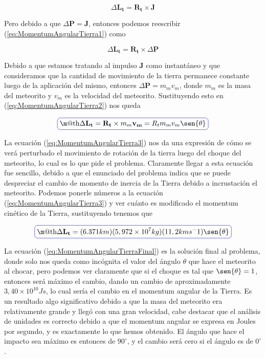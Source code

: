 \documentclass[a4paper,10pt]{article}
\makeatletter
\numberwithin{equation}{section}
\newcommand*{\boxcolor}{blue}
\renewcommand{\boxed}[1]{\textcolor{\boxcolor}{%
\tikz[baseline={([yshift=-1ex]current bounding box.center)}] \node [rectangle, minimum width=1ex,rounded corners,draw] {\normalcolor\m@th$\displaystyle#1$};}}
\makeatother
\begin{document}
\begin{equation}
 \Delta \mathbf{L_t} = \mathbf{R_t} \times \mathbf{J}
 \label{eq:MomentumAngularTierra1}
\end{equation}

Pero debido a que $\Delta \mathbf{P} = \mathbf{J}$, entonces podemos reescribir 
(\ref{eq:MomentumAngularTierra1}) como

\begin{equation}
 \Delta \mathbf{L_t} = \mathbf{R_t} \times \Delta \mathbf{P}
 \label{eq:MomentumAngularTierra2} 
\end{equation}

Debido a que estamos tratando al impulso $\mathbf{J}$ como instantáneo y que consideramos
que la cantidad de movimiento de la tierra permanece constante luego de la aplicación
del mismo, entonces $\Delta \mathbf{P} = m_m v_m$, donde $m_m$ es la masa del meteorito
y $v_m$ es la velocidad del meteorito. Sustituyendo esto en (\ref{eq:MomentumAngularTierra2})
nos queda

\begin{equation}
 \boxed{\Delta \mathbf{L_t} = \mathbf{R_t} \times m_m \mathbf{v_m} = R_t m_m v_m \sen{\theta}}
 \label{eq:MomentumAngularTierra3}
\end{equation}

La ecuación (\ref{eq:MomentumAngularTierra3}) nos da una expresión de cómo se verá
perturbado el movimiento de rotación de la tierra luego del choque del meteorito, lo cual
es lo que pide el problema. Claramente llegar a esta ecuación fue sencillo, debido a que
el enunciado del problema indica que se puede despreciar el cambio de momento de inercia
de la Tierra debido a incrustación el meteorito. Podemos ponerle números a la ecuación
(\ref{eq:MomentumAngularTierra3}) y ver cuánto es modificado el momentum cinético de la 
Tierra, sustituyendo tenemos que

\begin{equation}
 \boxed{\Delta \mathbf{L_t} = (6.371 km) (5,972 \times 10^7 kg) (11,2 km s^-1) \sen{\theta}}
 \label{eq:MomentumAngularTierraFinal}
\end{equation}

La ecuación (\ref{eq:MomentumAngularTierraFinal}) es la solución final al problema,
donde solo nos queda como incógnita el valor del ángulo $\theta$ que hace el meteorito
al chocar, pero podemos ver claramente que si el choque es tal que $\sen{\theta} = 1$, entonces
será máximo el cambio, dando un cambio de aproximadamente $3,40 \times 10^10 Js$, lo cual
sería el cambio en el momentum angular de la Tierra. Es un resultado algo significativo
debido a que la masa del meteorito era relativamente grande y llegó con una gran velocidad,
cabe destacar que el análisis de unidades es correcto debido a que el momentum angular
se expresa en Joules por segundo, y es exactamente lo que hemos obtenido. El ángulo
que hace el impacto sea máximo es entonces de $90^\circ$, y el cambio será cero si 
el ángulo es de $0^\circ$.
\end{document}
